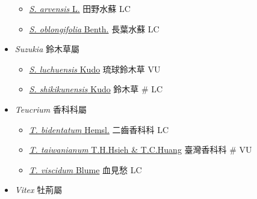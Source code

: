 \begin{itemize}
  \begin{itemize}
        \item[] \href{http://www.theplantlist.org/tpl1.1/search?q=Stachys+arvensis}{\textit{S. arvensis} L.}   田野水蘇   LC
        \item[] \href{http://www.theplantlist.org/tpl1.1/search?q=Stachys+oblongifolia}{\textit{S. oblongifolia} Benth.}   長葉水蘇   LC
  \end{itemize}
 \item[] \textit{Suzukia} 鈴木草屬
                                
  \begin{itemize}
        \item[] \href{http://www.theplantlist.org/tpl1.1/search?q=Suzukia+luchuensis}{\textit{S. luchuensis} Kudo}   琉球鈴木草   VU
        \item[] \href{http://www.theplantlist.org/tpl1.1/search?q=Suzukia+shikikunensis}{\textit{S. shikikunensis} Kudo}   鈴木草  \# LC
  \end{itemize}
 \item[] \textit{Teucrium} 香科科屬
                                
  \begin{itemize}
        \item[] \href{http://www.theplantlist.org/tpl1.1/search?q=Teucrium+bidentatum}{\textit{T. bidentatum} Hemsl.}   二齒香科科   LC
        \item[] \href{http://www.theplantlist.org/tpl1.1/search?q=Teucrium+taiwanianum}{\textit{T. taiwanianum} T.H.Hsieh \& T.C.Huang}   臺灣香科科  \# VU
        \item[] \href{http://www.theplantlist.org/tpl1.1/search?q=Teucrium+viscidum}{\textit{T. viscidum} Blume}   血見愁   LC
  \end{itemize}
 \item[] \textit{Vitex} 牡荊屬
                                

\end{itemize}
